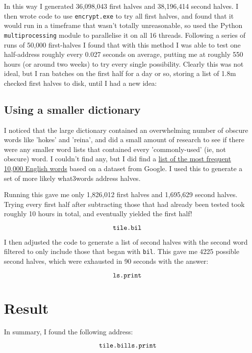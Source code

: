 \documentclass[11pt]{article} %
\newcommand{\textapprox}{\raisebox{0.5ex}{\texttildelow}}
\begin{document}
In this way I generated 36,098,043 first halves and 38,196,414 second halves. I then wrote code to use \verb|encrypt.exe| to try all first halves, and found that it would run in a timeframe that wasn't totally unreasonable, so used the Python \verb|multiprocessing| module to parallelise it on all 16 threads. Following a series of runs of 50,000 first-halves I found that with this method I was able to test one half-address roughly every 0.027 seconds on average, putting me at roughly 550 hours (or around two weeks) to try every single possibility. Clearly this was not ideal, but I ran batches on the first half for a day or so, storing a list of \textapprox{}1.8m checked first halves to disk, until I had a new idea:

\subsection{Using a smaller dictionary}

I noticed that the large dictionary contained an overwhelming number of obscure words like 'hokes' and 'reina', and did a small amount of research to see if there were any smaller word lists that contained every 'commonly-used' (ie, not obscure) word. I couldn't find any, but I did find a \href{https://github.com/first20hours/google-10000-english/blob/master/google-10000-english-no-swears.txt}{list of the most frequent 10,000 English words} based on a dataset from Google. I used this to generate a set of more likely what3words address halves.

Running this gave me only 1,826,012 first halves and 1,695,629 second halves. Trying every first half after subtracting those that had already been tested took roughly 10 hours in total, and eventually yielded the first half!

$$
\verb|tile.bil|
$$

I then adjusted the code to generate a list of second halves with the second word filtered to only include those that began with \verb|bil|. This gave me 4225 possible second halves, which were exhausted in 90 seconds with the answer:

$$
\verb|ls.print|
$$

\section{Result}

In summary, I found the following address:

$$
\verb|tile.bills.print|
$$
\end{document}
